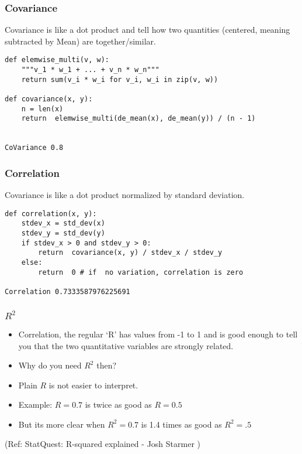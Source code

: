 \begin{frame}[fragile]\frametitle{Covariance}
Covariance is like a dot product and tell how two quantities (centered, meaning subtracted by Mean) are together/similar.
\begin{lstlisting}
def elemwise_multi(v, w):
    """v_1 * w_1 + ... + v_n * w_n"""
    return sum(v_i * w_i for v_i, w_i in zip(v, w))

def covariance(x, y):
	n = len(x)
	return	elemwise_multi(de_mean(x), de_mean(y)) / (n - 1)


CoVariance 0.8
\end{lstlisting}
\end{frame}

\begin{frame}[fragile]\frametitle{Correlation}
Covariance is like a dot product normalized by standard deviation.
\begin{lstlisting}
def correlation(x, y):
	stdev_x = std_dev(x)
  	stdev_y = std_dev(y)
	if stdev_x > 0 and stdev_y > 0:
		return	covariance(x, y) / stdev_x / stdev_y
	else:
		return	0 # if	no variation, correlation is zero

Correlation 0.7333587976225691
\end{lstlisting}
\end{frame}

\begin{frame}[fragile]\frametitle{$R^2$}

	\begin{itemize}
	\item Correlation, the regular `R' has values from -1 to 1 and is good enough to tell you that the two quantitative variables are strongly related.
	\item Why do you need $R^2$ then?
	\item Plain $R$ is not easier to interpret. 
	\item Example: $R=0.7$ is twice as good as $R=0.5$
	\item But its more clear when $R^2 = 0.7$ is 1.4 times as good as $R^2=.5$
	\end{itemize}
  
\tiny{(Ref: StatQuest: R-squared explained - Josh Starmer )}
\end{frame}


